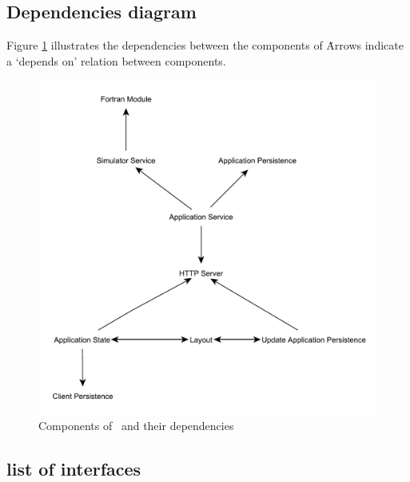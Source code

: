 \subsection{Dependencies diagram}
\label{subsec:depdiag}
Figure \ref{fig:compdependencies} illustrates the dependencies between the components of \projectname\. Arrows indicate a `depends on' relation between components.

\noindent
\begin{figure}
	\centering
	\includegraphics[width=\textwidth]{ComponentDependencies}
	\caption{Components of \projectname\ and their dependencies}
	\label{fig:compdependencies}
\end{figure}

\subsection{list of interfaces}
\label{subsec:compinterfaces}






